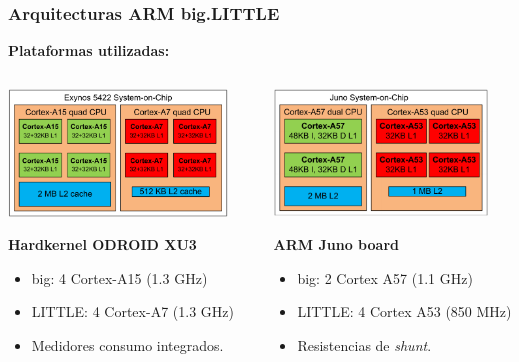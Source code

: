 \documentclass[10pt]{beamer}
\begin{document}
\begin{frame}
  \frametitle{Arquitecturas ARM big.LITTLE}
  { 
    {\bf Plataformas utilizadas:}

    \vfill
    \begin{columns}[onlytextwidth]
      \begin{column}{0.5\textwidth}
        \includegraphics[width=0.9\textwidth]{Figures/Exynos-2.pdf}
        
        \footnotesize
        {\bf Hardkernel ODROID XU3}
        \begin{itemize}
        \item {\sc big:} 4 Cortex-A15 (1.3 GHz)
        \item {\sc LITTLE:} 4 Cortex-A7 (1.3 GHz)
        \item Medidores consumo integrados. 
        \end{itemize}
      \end{column}
      
      \begin{column}{0.5\textwidth}
        \includegraphics[width=0.9\textwidth]{Figures/Juno.pdf}
        
        {
          \footnotesize
          {\bf ARM Juno board}
          \begin{itemize}
          \item {\sc big:} 2 Cortex A57 (1.1 GHz)
          \item {\sc LITTLE:} 4 Cortex A53 (850 MHz)
          \item Resistencias de {\em shunt}.
          \end{itemize}
        }
      \end{column}
    \end{columns}
  }
\end{frame}
\end{document}
